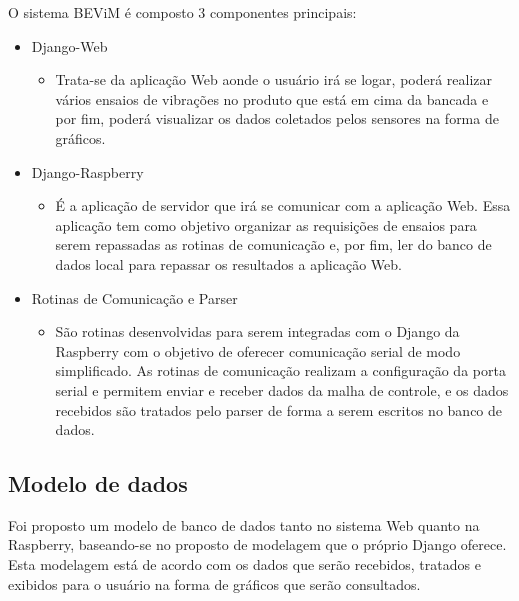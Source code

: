 O sistema BEViM é composto 3 componentes principais:
\newpage
\begin{itemize}
    \item Django-Web
    \begin{itemize}
        \item Trata-se da aplicação Web aonde o usuário irá se logar, poderá realizar vários ensaios de vibrações no produto que está em cima da bancada e por fim, poderá visualizar os dados coletados pelos sensores na forma de gráficos.
    \end{itemize}
    \item Django-Raspberry
    \begin{itemize}
        \item É a aplicação de servidor que irá se comunicar com a aplicação Web. Essa aplicação tem como objetivo organizar as requisições de ensaios para serem repassadas as rotinas de comunicação e, por fim, ler do banco de dados local para repassar os resultados a aplicação Web.
    \end{itemize}
    \item Rotinas de Comunicação e Parser
    \begin{itemize}
        \item São rotinas desenvolvidas para serem integradas com o Django da Raspberry com o objetivo de oferecer comunicação serial de modo simplificado. As rotinas de comunicação realizam a configuração da porta serial e permitem enviar e receber dados da malha de controle, e os dados recebidos são tratados pelo parser de forma a serem escritos no banco de dados.
    \end{itemize}
\end{itemize}

\subsection*{Modelo de dados}

Foi proposto um modelo de banco de dados tanto no sistema Web quanto na Raspberry, baseando-se no proposto de modelagem que o próprio Django oferece. Esta modelagem está de acordo com os dados que serão recebidos, tratados e exibidos para o usuário na forma de gráficos que serão consultados.

